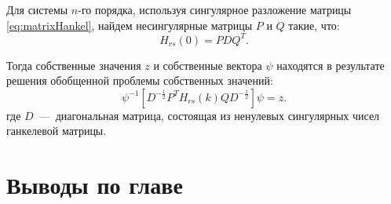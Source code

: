 Для системы $ n $-го порядка, используя сингулярное разложение матрицы \eqref{eq:matrixHankel}, найдем несингулярные матрицы $ P $ и $ Q $ такие, что:
\begin{equation}
	H_{rs}(0) = P D Q^T.
\end{equation}

Тогда собственные значения $ z $ и собственные вектора $ \psi $ находятся в результате решения обобщенной проблемы собственных значений:
\begin{equation}
	\psi^{-1} \left[ D^{-\frac{1}{2}} P^T H_{rs}(k) Q D^{-\frac{1}{2}} \right] \psi = z.
\end{equation}
где $ D $~---~диагональная матрица, состоящая из ненулевых сингулярных чисел ганкелевой матрицы.

\section{Выводы по главе \thechapter}